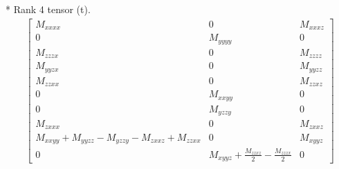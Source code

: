 \documentclass[fleqn,8pt,landscape]{jsarticle}
\begin{document}
* Rank 4 tensor (t).
\begin{align*}
\begin{bmatrix} M_{xxxx} & 0 & M_{xxxz} \\ 0 & M_{yyyy} & 0 \\ M_{zzzx} & 0 & M_{zzzz} \\ M_{yyzx} & 0 & M_{yyzz} \\ M_{zzxx} & 0 & M_{zzxz} \\ 0 & M_{xxyy} & 0 \\ 0 & M_{yzzy} & 0 \\ M_{zxxx} & 0 & M_{zxxz} \\ M_{xxyy} + M_{yyzz} - M_{yzzy} - M_{zxxz} + M_{zzxx} & 0 & M_{xyyz} \\ 0 & M_{xyyz} + \frac{M_{zzxz}}{2} - \frac{M_{zzzx}}{2} & 0 \end{bmatrix}
\end{align*}
\end{document}
